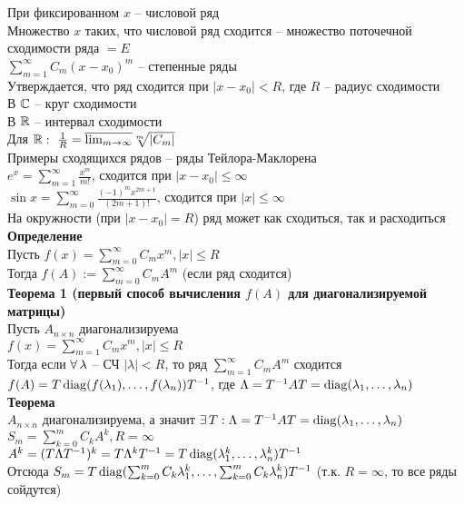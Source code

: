 \documentclass[12pt]{article}
\begin{document}
При фиксированном $x$ -- числовой ряд\\
Множество $x$ таких, что числовой ряд сходится -- множество поточечной сходимости ряда $= E$\\
$\sum_{m=1}^\infty C_m (x-x_0)^m$ -- степенные ряды\\
Утверждается, что ряд сходится при $|x-x_0| < R$, где $R$ -- радиус сходимости\\
В $\mathbb{C}$ -- круг сходимости\\
В $\mathbb{R}$ -- интервал сходимости\\
Для $\mathbb{R}:\ \frac1R = \overline{\lim_{m\rightarrow \infty}} \sqrt[m]{|C_m|}$\\
Примеры сходящихся рядов -- ряды Тейлора-Маклорена\\
$e^x = \sum_{m=1}^\infty \frac{x^m}{m!}$, сходится при $|x-x_0| \leq \infty$\\
$\sin x = \sum_{m=0}^\infty \frac{(-1)^m x^{2m+1}}{(2m+1)!}$, сходится при $|x| \leq \infty$\\
На окружности (при $|x-x_0| = R$) ряд может как сходиться, так и расходиться\\
\textbf{Определение}\\
Пусть $f(x) = \sum_{m=0}^\infty C_m x^m, |x| \leq R$\\
Тогда $f(A):= \sum_{m=0}^\infty C_m A^m$ (если ряд сходится)\\
\textbf{Теорема 1 (первый способ вычисления $f(A)$ для диагонализируемой матрицы)}\\
Пусть $A_{n\times n}$ диагонализируема\\
$f(x) = \sum_{m=1}^\infty C_m x^m, |x| \leq R$\\
Тогда если $\forall\, \lambda$ -- СЧ $|\lambda| < R$, то ряд $\sum_{m=1}^\infty C_m A^m$ сходится\\
$f(A) = T\operatorname{diag}(f(\lambda_1), \ldots, f(\lambda_n))T^{-1}$, где $\Lambda = T^{-1}AT = \operatorname{diag}(\lambda_1, \ldots, \lambda_n)$\\
\textbf{Теорема}\\
$A_{n\times n}$ диагонализируема, а значит $\exists\, T: \Lambda = T^{-1}AT = \operatorname{diag}(\lambda_1, \ldots, \lambda_n)$\\
$S_m = \sum_{k = 0}^m C_k A^k, R = \infty$\\
$A^k = (T \Lambda T^{-1})^k = T \Lambda^k T^{-1} = T\operatorname{diag}(\lambda_1^k, \ldots, \lambda_n^k)T^{-1}$\\
Отсюда $S_m = T\operatorname{diag}(\sum_{k=0}^m C_k\lambda_1^k, \ldots, \sum_{k=0}^m C_k\lambda_n^k)T^{-1}$ (т.к. $R = \infty$, то все ряды сойдутся)\\
\end{document}
